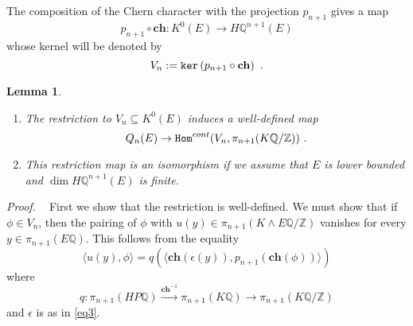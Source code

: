 \documentclass[12pt]{article}
\newtheorem{lem}[theorem]{Lemma}
\newcommand{\Thom}{{\tt Thom}}
\renewcommand{\ker}{{\tt ker}}
\newcommand{\proof}{{\it Proof.$\:\:\:\:$}}
\newcommand{\Z}{{\mathbb{Z}}}
\newcommand{\Q}{{\mathbb{Q}}}
\newcommand{\Hom}{{\tt Hom}}
\newcommand{\Td}{{\mathbf{Td}}}
\newcommand{\ch}{{\mathbf{ch}}}
\begin{document}
The composition of the Chern character  with  the projection  $p_{n+1}$ gives a map $$p_{n+1}\circ \ch :K^{0}(E)\to H\Q^{n+1}(E)$$
whose kernel will be denoted by 
\begin{equation}\label{eq131}V_{n}:=\ker\left(p_{n+1}\circ \ch \right)\ .\end{equation}
\begin{lem}\label{lem1} 
\begin{enumerate}
\item
The restriction to $V_{n}\subseteq K^{0}(E)$ induces a well-defined map
\begin{equation}\label{eq100}Q_{n}(E)\to \Hom^{cont}(V_{n},\pi_{n+1}(K\Q/\Z))\ .\end{equation}
\item This restriction map 
 is an isomorphism if we assume  that   $E$ is lower bounded and $\dim H\Q^{n+1}(E)$ is finite.
 \end{enumerate}
\end{lem}
\proof
First we show that the restriction is well-defined. We must show that if $\phi\in V_{n}$, then the pairing of $\phi$ with  $u(y)\in \pi_{n+1}(K\wedge E\Q/\Z)$  vanishes  for every
$y\in \pi_{n+1}(E\Q)$.
This follows from   the equality
\begin{equation}\label{t2013}\langle u(y),\phi\rangle=q(\langle \ch(\epsilon(y)), p_{n+1}(\ch(\phi))\rangle)\end{equation}
where $$q: \pi_{n+1}(HP\Q)\stackrel{\ch^{-1}}{\to} \pi_{n+1}(K\Q)\to \pi_{n+1}(K\Q/\Z)$$
and $\epsilon$ is as in \eqref{eq3}.


\end{document}

